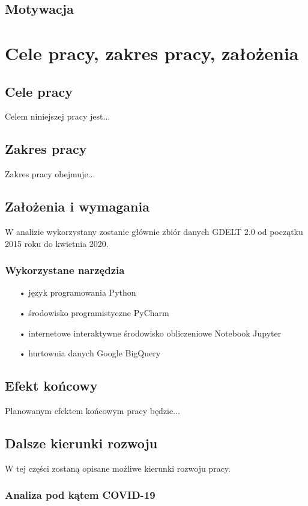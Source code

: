 \documentclass[11pt]{report}
\begin{document}
 \section{Motywacja}


 \chapter{Cele pracy, zakres pracy, założenia}\label{ch:cele}

 \section{Cele pracy}
 Celem niniejszej pracy jest...

 \section{Zakres pracy}
 Zakres pracy obejmuje...
 
 
 \section{Założenia i wymagania}
 W analizie wykorzystany zostanie głównie zbiór danych GDELT 2.0 od początku 2015 roku do kwietnia 2020.
 
 \subsection{Wykorzystane narzędzia}
 \begin{enumerate}
 \item[•] język programowania Python
 \item[•] środowisko programistyczne PyCharm 
 \item[•] internetowe interaktywne środowisko obliczeniowe Notebook Jupyter
 \item[•] hurtownia danych Google BigQuery
 \end{enumerate}
  
 \section{Efekt końcowy}
 Planowanym efektem końcowym pracy będzie...
 
 \section{Dalsze kierunki rozwoju}
 W tej części zostaną opisane możliwe kierunki rozwoju pracy.
 \subsection{Analiza pod kątem COVID-19}
\end{document}

